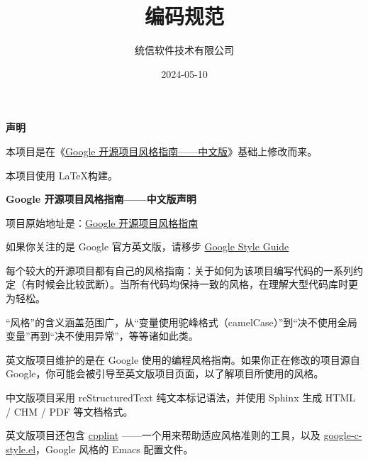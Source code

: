 \documentclass{utbook}
\title{编码规范}
\date{2024-05-10}
\author{统信软件技术有限公司}
\begin{document}
\maketitle


\textbf{声明}

本项目是在《\href{https://github.com/zh-google-styleguide/zh-google-styleguide}{Google 开源项目风格指南——中文版}》基础上修改而来。

本项目使用 \LaTeX 构建。

\begin{DNote}

\textbf{Google 开源项目风格指南——中文版声明}

项目原始地址是：\href{https://github.com/zh-google-styleguide/zh-google-styleguide}{Google 开源项目风格指南}

如果你关注的是 Google 官方英文版，请移步 \href{https://github.com/google/styleguide}{Google Style Guide}

每个较大的开源项目都有自己的风格指南：关于如何为该项目编写代码的一系列约定（有时候会比较武断）。当所有代码均保持一致的风格，在理解大型代码库时更为轻松。

“风格”的含义涵盖范围广，从“变量使用驼峰格式（camelCase）”到“决不使用全局变量”再到“决不使用异常”，等等诸如此类。

英文版项目维护的是在 Google 使用的编程风格指南。如果你正在修改的项目源自 Google，你可能会被引导至英文版项目页面，以了解项目所使用的风格。

中文版项目采用 reStructuredText 纯文本标记语法，并使用 Sphinx 生成 HTML / CHM / PDF 等文档格式。

英文版项目还包含 \href{https://github.com/google/styleguide/tree/gh-pages/cpplint}{cpplint} ——一个用来帮助适应风格准则的工具，以及 \href{https://raw.githubusercontent.com/google/styleguide/gh-pages/google-c-style.el}{google-c-style.el}，Google 风格的 Emacs 配置文件。

\end{DNote}

\newpage
\utMakeTOC
\newpage





\end{document}
